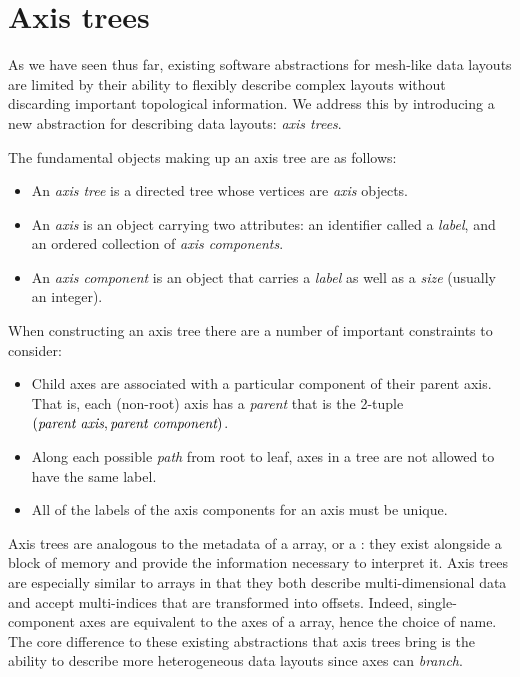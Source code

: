 \documentclass[thesis]{subfiles}
\begin{document}
\chapter{Axis trees}
\label{chapter:axis_trees}

As we have seen thus far, existing software abstractions for mesh-like data layouts are limited by their ability to flexibly describe complex layouts without discarding important topological information.
We address this by introducing a new abstraction for describing data layouts: \emph{axis trees}.

The fundamental objects making up an axis tree are as follows:
\begin{itemize}
  \item
    An \emph{axis tree} is a directed tree whose vertices are \emph{axis} objects.
  \item
    An \emph{axis} is an object carrying two attributes: an identifier called a \emph{label}, and an ordered collection of \emph{axis components}.
  \item
    An \emph{axis component} is an object that carries a \emph{label} as well as a \emph{size} (usually an integer).
\end{itemize}

When constructing an axis tree there are a number of important constraints to consider:
\begin{itemize}
  \item
    Child axes are associated with a particular component of their parent axis.
    That is, each (non-root) axis has a \emph{parent} that is the 2-tuple $(\textnormal{\it parent axis}, \textnormal{\it parent component})$.
  \item
    Along each possible \emph{path} from root to leaf, axes in a tree are not allowed to have the same label.
  \item
    All of the labels of the axis components for an axis must be unique.
\end{itemize}

Axis trees are analogous to the metadata of a \numpy{} array, or a  : they exist alongside a block of memory and provide the information necessary to interpret it.
Axis trees are especially similar to \numpy{} arrays in that they both describe multi-dimensional data and accept multi-indices that are transformed into offsets.
Indeed, single-component axes are equivalent to the axes of a \numpy{} array, hence the choice of name.
The core difference to these existing abstractions that axis trees bring is the ability to describe more heterogeneous data layouts since axes can \emph{branch}.
\end{document}
